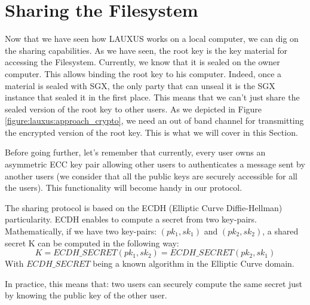 \documentclass[../main.tex]{subfiles}
\begin{document}
\section{Sharing the Filesystem}
\label{section:lauxus:sharing}

\par Now that we have seen how LAUXUS works on a local computer, we can dig on the sharing capabilities. As we have seen, the root key is the key material for accessing the Filesystem. Currently, we know that it is sealed on the owner computer. This allows binding the root key to his computer. Indeed, once a material is sealed with SGX, the only party that can unseal it is the SGX instance that sealed it in the first place. This means that we can't just share the sealed version of the root key to other users. As we depicted in Figure \ref{figure:lauxus:approach_crypto}, we need an out of band channel for transmitting the encrypted version of the root key. This is what we will cover in this Section.

\par Before going further, let's remember that currently, every user owns an asymmetric ECC key pair allowing other users to authenticates a message sent by another users (we consider that all the public keys are securely accessible for all the users). This functionality will become handy in our protocol.

\medbreak
\par The sharing protocol is based on the ECDH (Elliptic Curve Diffie-Hellman) particularity. ECDH enables to compute a secret from two key-pairs. Mathematically, if we have two key-pairs: $\mathit{(pk_1, sk_1)}$ and $\mathit{(pk_2, sk_2)}$, a shared secret K can be computed in the following way:
\begin{equation}
    \label{equation:lauxus:ecdh_secret}
    \mathit{K = ECDH\_SECRET(pk_1, sk_2) = ECDH\_SECRET(pk_2, sk_1)}
\end{equation}
With $\mathit{ECDH\_SECRET}$ being a known algorithm in the Elliptic Curve domain.
\par In practice, this means that: two users can securely compute the same secret just by knowing the public key of the other user.
\end{document}
